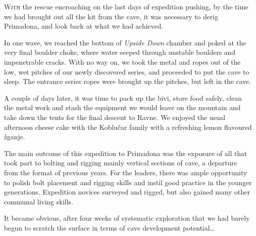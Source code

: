 \newpage
\begin{tcolorbox}
	
	\lettrine{W}{ith} the rescue encroaching on the last days of expedition pushing, by the time we had  brought out all the kit from the cave, it was necessary to derig Primadona, and look back at what we had achieved.

 	In one wave, we reached the bottom of \emph{Upside Down} chamber and poked at the very final boulder choke, where water seeped through unstable boulders and impenetrable cracks. With no way on, we took the metal and ropes out of the low, wet pitches of our newly discovered series, and proceeded to put the cave to sleep. The entrance series ropes were brought up the pitches, but left in the cave.

	A couple of days later, it was time to pack up the bivi, store food safely, clean the metal work and stash the equipment we would leave on the mountain and take down the tents for the final descent to Ravne. We enjoyed the usual afternoon cheese cake with the Koblu{\v{c}}ar family with a refreshing lemon flavoured {\v{z}}ganje.

	The main outcome of this expedition to Primadona was the exposure of all that took part to bolting and rigging mainly vertical sections of cave, a departure from the format of previous years. For the leaders, there was ample opportunity to polish bolt placement and rigging skills and instil good practice in the younger generations. Expedition novices surveyed and rigged, but also gained many other communal living skills.

	It became obvious, after four weeks of systematic exploration that we had barely begun to scratch the surface in terms of cave development potential…
	\\
	\\
	\\
\end{tcolorbox}

